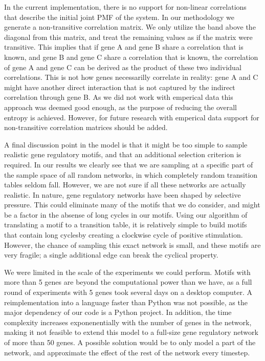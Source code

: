 \documentclass[../main.tex]{subfiles}
\begin{document}
In the current implementation, there is no support for non-linear correlations that describe the initial joint PMF of the system.
In our methodology we generate a non-transitive correlation matrix.
We only utilize the band above the diagonal from this matrix, and treat the remaining values as if the matrix were transitive.
This implies that if gene A and gene B share a correlation that is known, and gene B and gene C share a correlation that is known, the correlation of gene A and gene C can be derived as the product of these two individual correlations.
This is not how genes necessarilly correlate in reality: gene A and C might have another direct interaction that is not captured by the indirect correlation through gene B.
As we did not work with emperical data this approach was deemed good enough, as the purpose of reducing the overall entropy is achieved.
However, for future research with emperical data support for non-transitive correlation matrices should be added.

A final discussion point in the model is that it might be too simple to sample realistic gene regulatory motifs, and that an additional selection criterion is required.
In our results we clearly see that we are sampling at a specific part of the sample space of all random networks, in which completely random transition tables seldom fall.
However, we are not sure if all these networks are actually realistic.
In nature, gene regulatory networks have been shaped by selective pressure.
This could eliminate many of the motifs that we do consider, and might be a factor in the absense of long cycles in our motifs.
Using our algorithm of translating a motif to a transition table, it is relatively simple to build motifs that  contain long cyclesby creating a clockwise cycle of positive stimulation.
However, the chance of sampling this exact network is small, and these motifs are very fragile; a single additional edge can break the cyclical property.

We were limited in the scale of the experiments we could perform.
Motifs with more than 5 genes are beyond the computational power than we have, as a full round of experiments with 5 genes took several days on a desktop computer. %
A reimplementation into a language faster than Python was not possible, as the major dependency of our code is a Python project.
In addition, the time complexity increases exponenentially with the number of genes in the network, making it not feasible to extend this model to a full-size gene regulatory network of more than 50 genes.
A possible solution would be to only model a part of the network, and approximate the effect of the rest of the network every timestep.
\end{document}
